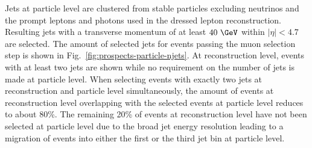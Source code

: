 
Jets  at particle level are clustered from stable particles excluding neutrinos and the prompt leptons and photons used in the dressed lepton reconstruction. Resulting jets with a transverse momentum of at least $40~\GeV$ within $|\eta|<4.7$ are selected. The amount of selected jets for events passing the muon selection step is shown in Fig.~\ref{fig:prospects-particle-njets}. At reconstruction level, events with at least two jets are shown while no requirement on the number of jets is made at particle level. When selecting events with exactly two jets at reconstruction and particle level simultaneously, the amount of events at reconstruction level overlapping with the selected events at particle level reduces to about 80\%. The remaining 20\% of events at reconstruction level have not been selected at particle level due to the broad jet energy resolution leading to a migration of events into either the first or the third jet bin at particle level.

